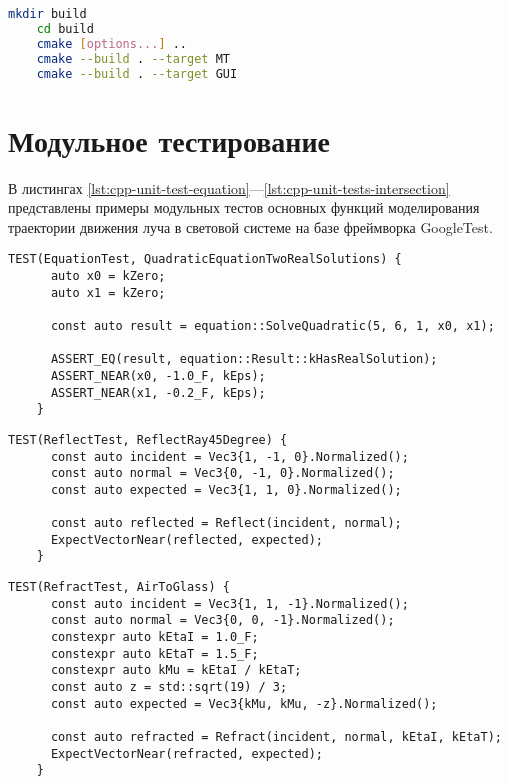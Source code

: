 
\begin{lstlisting}[gobble=8, language=bash, caption={Сборка\label{lst:cmake}}]
	mkdir build
	cd build
	cmake [options...] ..
	cmake --build . --target MT
	cmake --build . --target GUI
\end{lstlisting}

\section{Модульное тестирование}

В листингах \ref{lst:cpp-unit-test-equation}—\ref{lst:cpp-unit-tests-intersection} представлены примеры модульных тестов основных функций моделирования траектории движения луча в световой системе на базе фреймворка GoogleTest.

\begin{lstlisting}[gobble=8, language=C++23, caption={Юнит-тест функции решения квадратных уравнений\label{lst:cpp-unit-test-equation}}]
	TEST(EquationTest, QuadraticEquationTwoRealSolutions) {
	  auto x0 = kZero;
	  auto x1 = kZero;

	  const auto result = equation::SolveQuadratic(5, 6, 1, x0, x1);

	  ASSERT_EQ(result, equation::Result::kHasRealSolution);
	  ASSERT_NEAR(x0, -1.0_F, kEps);
	  ASSERT_NEAR(x1, -0.2_F, kEps);
	}
\end{lstlisting}

\begin{lstlisting}[gobble=8, language=C++23, caption={Юнит-тест функции отражения\label{lst:cpp-unit-test-reflection}}]
	TEST(ReflectTest, ReflectRay45Degree) {
	  const auto incident = Vec3{1, -1, 0}.Normalized();
	  const auto normal = Vec3{0, -1, 0}.Normalized();
	  const auto expected = Vec3{1, 1, 0}.Normalized();

	  const auto reflected = Reflect(incident, normal);
	  ExpectVectorNear(reflected, expected);
	}
\end{lstlisting}

\begin{lstlisting}[gobble=8, language=C++23, caption={Юнит-тест функции преломления\label{lst:cpp-unit-test-refraction}}]
	TEST(RefractTest, AirToGlass) {
	  const auto incident = Vec3{1, 1, -1}.Normalized();
	  const auto normal = Vec3{0, 0, -1}.Normalized();
	  constexpr auto kEtaI = 1.0_F;
	  constexpr auto kEtaT = 1.5_F;
	  constexpr auto kMu = kEtaI / kEtaT;
	  const auto z = std::sqrt(19) / 3;
	  const auto expected = Vec3{kMu, kMu, -z}.Normalized();

	  const auto refracted = Refract(incident, normal, kEtaI, kEtaT);
	  ExpectVectorNear(refracted, expected);
	}
\end{lstlisting}

